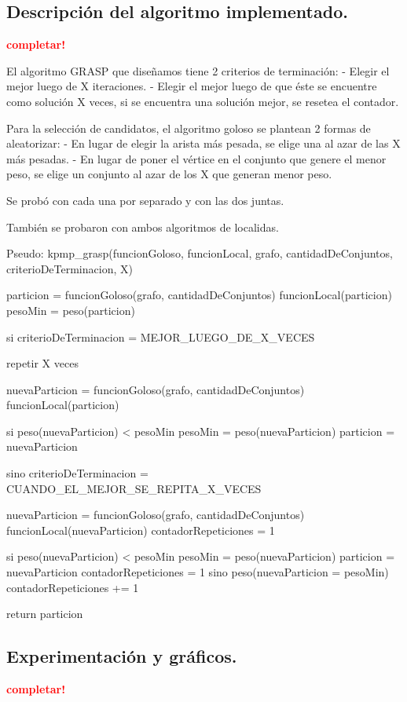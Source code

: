 \subsection{Descripción del algoritmo implementado.}
\vspace*{0.3cm}
\textcolor{red}{\textbf{completar!}}

El algoritmo GRASP que diseñamos tiene 2 criterios de terminación:
- Elegir el mejor luego de X iteraciones.
- Elegir el mejor luego de que éste se encuentre como solución X veces, si se encuentra una solución mejor, se resetea el contador.

Para la selección de candidatos, el algoritmo goloso se plantean 2 formas de aleatorizar:
- En lugar de elegir la arista más pesada, se elige una al azar de las X más pesadas.
- En lugar de poner el vértice en el conjunto que genere el menor peso, se elige un conjunto al azar de los X que generan menor peso.

Se probó con cada una por separado y con las dos juntas.

También se probaron con ambos algoritmos de localidas.

Pseudo:
kpmp_grasp(funcionGoloso, funcionLocal, grafo, cantidadDeConjuntos, criterioDeTerminacion, X) {
	particion = funcionGoloso(grafo, cantidadDeConjuntos)
	funcionLocal(particion)
	pesoMin = peso(particion)

	si criterioDeTerminacion = MEJOR_LUEGO_DE_X_VECES {
		repetir X veces {
			nuevaParticion = funcionGoloso(grafo, cantidadDeConjuntos)
			funcionLocal(particion)

			si peso(nuevaParticion) < pesoMin {
				pesoMin = peso(nuevaParticion)
				particion = nuevaParticion
			}
		}
	} sino criterioDeTerminacion = CUANDO_EL_MEJOR_SE_REPITA_X_VECES {
		nuevaParticion = funcionGoloso(grafo, cantidadDeConjuntos)
		funcionLocal(nuevaParticion)
		contadorRepeticiones = 1

		si peso(nuevaParticion) < pesoMin {
			pesoMin = peso(nuevaParticion)
			particion = nuevaParticion
			contadorRepeticiones = 1
		} sino peso(nuevaParticion = pesoMin) {
			contadorRepeticiones += 1
		}
	}

	return particion
}

\newpage
\subsection{Experimentación y gráficos.}
\vspace*{0.3cm}
\textcolor{red}{\textbf{completar!}}
